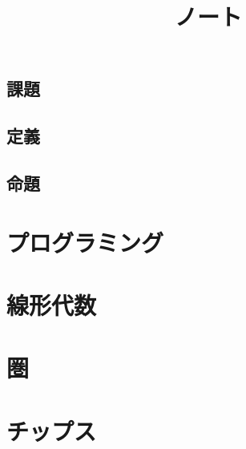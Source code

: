 \documentclass[5pt]{jreport}
\title{ノート}
\author{}
\begin{document}
\maketitle
\tableofcontents
\section*{課題}
\section*{定義}
\section*{命題}

\chapter{プログラミング}
\chapter{線形代数}
\chapter{圏}
\chapter{チップス}





\end{document}
